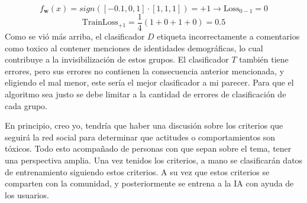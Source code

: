\documentclass[14pt,a4paper]{report}
\begin{document}
		\begin{equation*}
		f_{\textbf{w}}(x)=sign([-0.1,0,1]\cdot[1,1,1])=+1\rightarrow
		\text{Loss}_{0-1}=0
	\end{equation*}
	\begin{equation*}
		\text{TrainLoss}_{+1}=\frac{1}{4}(1+0+1+0)=0.5
	\end{equation*}
 Como se vió más arriba, el clasificador $D$ etiqueta incorrectamente a comentarios como toxico al contener menciones de identidades demográficas, lo cual contribuye a la invisibilización de estos grupos. El clasificador $T$ también tiene errores, pero sus errores no contienen la consecuencia anterior mencionada, y eligiendo el mal menor, este sería el mejor clasificador a mi parecer. Para que el algoritmo sea justo se debe limitar a la cantidad de errores de clasificación de cada grupo.

 En principio, creo yo, tendría que haber una discusión sobre los criterios que seguirá la red social para determinar que actitudes o comportamientos son tóxicos. Todo esto acompañado de personas con que sepan sobre el tema, tener una perspectiva amplia. Una vez tenidos los criterios, a mano se clasificarán datos de entrenamiento siguiendo estos criterios. A su vez que estos criterios se comparten con la comunidad, y posteriormente se entrena a la IA con ayuda de los usuarios.
\end{document}
